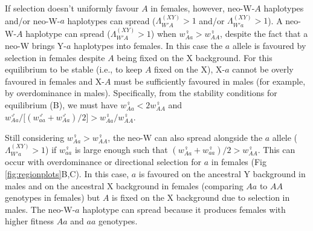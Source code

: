 \documentclass[10pt,letterpaper]{article}
\begin{document}
If selection doesn't uniformly favour $A$ in females, however, neo-W-$A$ haplotypes and/or neo-W-$a$ haplotypes can spread ($\Lambda_{W'A}^{(XY)}>1$ and/or $\Lambda_{W'a}^{(XY)}>1$).
A neo-W-$A$ haplotype can spread ($\Lambda_{W'A}^{(XY)}>1$) when $w_{Aa}^\female>w_{AA}^\female$, despite the fact that a neo-W brings Y-$a$ haplotypes into females.
In this case the $a$ allele is favoured by selection in females despite $A$ being fixed on the X background.
For this equilibrium to be stable (i.e.,  to keep $A$ fixed on the X), X-$a$ cannot be overly favoured in females and X-$A$ must be sufficiently favoured in males (for example, by overdominance in males). 
Specifically, from the stability conditions for equilibrium (B), we must have $w_{Aa}^\female < 2 w_{AA}^\female$ and $w_{Aa}^\male/\big[(w_{aa}^\male+w_{Aa}^\male)/2\big]>w_{Aa}^\female/w_{AA}^\female$. 

Still considering $w_{Aa}^\female>w_{AA}^\female$, the neo-W can also spread alongside the $a$ allele ($\Lambda_{W'a}^{(XY)}>1$) if $w_{aa}^\female$ is large enough such that $(w_{Aa}^\female+w_{aa}^\female)/2>w_{AA}^\female$.
This can occur with overdominance or directional selection for $a$ in females (Fig \ref{fig:regionplots}B,C).
In this case, $a$ is favoured on the ancestral Y background in males and on the ancestral X background in females (comparing $Aa$ to $AA$ genotypes in females) but $A$ is fixed on the X background due to selection in males. 
The neo-W-$a$ haplotype can spread because it produces females with higher fitness $Aa$ and $aa$ genotypes. 

\end{document}
